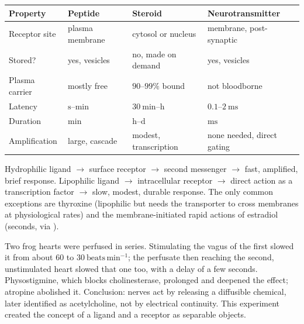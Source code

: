 \begin{tabular}{@{}lp{2.1cm}p{2.3cm}p{2.6cm}@{}}
\toprule
\textbf{Property} & \textbf{Peptide} & \textbf{Steroid} & \textbf{Neurotransmitter}\\
\midrule
Receptor site & plasma membrane & cytosol or nucleus & membrane, post-synaptic\\
Stored? & yes, vesicles & no, made on demand & yes, vesicles\\
Plasma carrier & mostly free & $90$--$99\%$ bound & not bloodborne\\
Latency & $\mathrm{s}$--$\mathrm{min}$ & $30\ \mathrm{min}$--$\mathrm{h}$ & $0.1$--$2\ \mathrm{ms}$\\
Duration & $\mathrm{min}$ & $\mathrm{h}$--$\mathrm{d}$ & $\mathrm{ms}$\\
Amplification & large, cascade & modest, transcription & none needed, direct gating\\
\bottomrule
\end{tabular}

\begin{keybox}[title={MEMORIZE: solubility predicts everything}]
Hydrophilic ligand $\rightarrow$ surface receptor $\rightarrow$ second messenger
$\rightarrow$ fast, amplified, brief response. Lipophilic ligand $\rightarrow$
intracellular receptor $\rightarrow$ direct action as a transcription factor
$\rightarrow$ slow, modest, durable response. The only common exceptions are
thyroxine (lipophilic but needs the  transporter to cross membranes at
physiological rates) and the membrane-initiated rapid actions of estradiol
(seconds, via ).
\end{keybox}

\begin{expbox}[title={EXPERIMENT: Loewi 1921, the first chemical transmitter}]
Two frog hearts were perfused in series. Stimulating the vagus of the first slowed it
from about $60$ to $30\ \mathrm{beats\,min^{-1}}$; the perfusate then reaching the
second, unstimulated heart slowed that one too, with a delay of a few seconds.
Physostigmine, which blocks cholinesterase, prolonged and deepened the effect;
atropine abolished it. Conclusion: nerves act by releasing a diffusible chemical,
later identified as acetylcholine, not by electrical continuity. This experiment
created the concept of a ligand and a receptor as separable objects.
\end{expbox}

